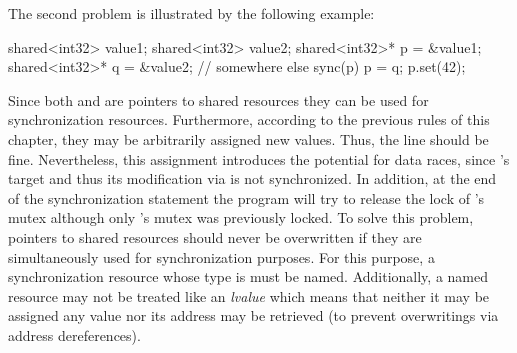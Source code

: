 The second problem is illustrated by the following example:
\begin{ccode}{}
shared<int32> value1;
shared<int32> value2;
shared<int32>* p = &value1;
shared<int32>* q = &value2;
// somewhere else
sync(p) {
  p = q;
  p.set(42);
}
\end{ccode}
Since both  and  are pointers to shared resources they can be used for synchronization resources. Furthermore, according to the previous rules of this chapter, they may be arbitrarily assigned new values. Thus, the line  should be fine. Nevertheless, this assignment introduces the potential for data races, since 's target  and thus its modification via  is not synchronized. In addition, at the end of the synchronization statement the program will try to release the lock of 's mutex although only 's mutex was previously locked. To solve this problem, pointers to shared resources should never be overwritten if they are simultaneously used for synchronization purposes. For this purpose, a synchronization resource whose type is  must be named. Additionally, a named resource may not be treated like an \textit{lvalue} which means that neither it may be assigned any value nor its address may be retrieved (to prevent overwritings via address dereferences).